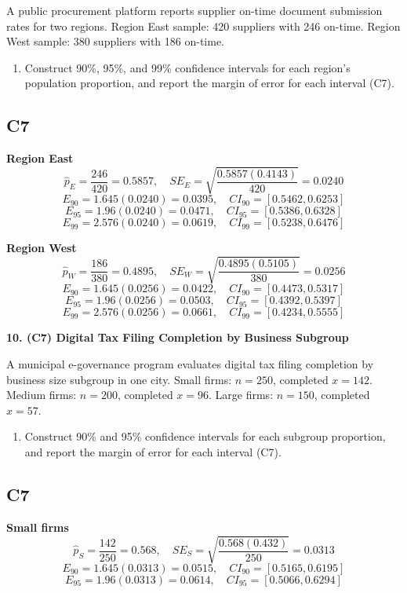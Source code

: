 \begin{ExamProblems}
		A public procurement platform reports supplier on-time document submission rates for two regions.
		Region East sample: 420 suppliers with 246 on-time.
		Region West sample: 380 suppliers with 186 on-time.
		\begin{enumerate}
			\item Construct 90\%, 95\%, and 99\% confidence intervals for each region's population proportion, and report the margin of error for each interval (C7).
		\end{enumerate}
		
		\subsection*{C7}
		\textbf{Region East}
		\[
		\hat{p}_E=\frac{246}{420}=0.5857,
		\quad SE_E=\sqrt{\frac{0.5857(0.4143)}{420}}=0.0240
		\]
		\[
		E_{90}=1.645(0.0240)=0.0395,\quad CI_{90}=[0.5462,0.6253]
		\]
		\[
		E_{95}=1.96(0.0240)=0.0471,\quad CI_{95}=[0.5386,0.6328]
		\]
		\[
		E_{99}=2.576(0.0240)=0.0619,\quad CI_{99}=[0.5238,0.6476]
		\]
		
		\textbf{Region West}
		\[
		\hat{p}_W=\frac{186}{380}=0.4895,
		\quad SE_W=\sqrt{\frac{0.4895(0.5105)}{380}}=0.0256
		\]
		\[
		E_{90}=1.645(0.0256)=0.0422,\quad CI_{90}=[0.4473,0.5317]
		\]
		\[
		E_{95}=1.96(0.0256)=0.0503,\quad CI_{95}=[0.4392,0.5397]
		\]
		\[
		E_{99}=2.576(0.0256)=0.0661,\quad CI_{99}=[0.4234,0.5555]
		\]
		
		\newpage
		\item
		\textbf{10. (C7) Digital Tax Filing Completion by Business Subgroup}
		
		A municipal e-governance program evaluates digital tax filing completion by business size subgroup in one city.
		Small firms: $n=250$, completed $x=142$.
		Medium firms: $n=200$, completed $x=96$.
		Large firms: $n=150$, completed $x=57$.
		\begin{enumerate}
			\item Construct 90\% and 95\% confidence intervals for each subgroup proportion, and report the margin of error for each interval (C7).
		\end{enumerate}
		
		\subsection*{C7}
		\textbf{Small firms}
		\[
		\hat{p}_S=\frac{142}{250}=0.568,
		\quad SE_S=\sqrt{\frac{0.568(0.432)}{250}}=0.0313
		\]
		\[
		E_{90}=1.645(0.0313)=0.0515,\quad CI_{90}=[0.5165,0.6195]
		\]
		\[
		E_{95}=1.96(0.0313)=0.0614,\quad CI_{95}=[0.5066,0.6294]
		\]
		

\end{ExamProblems}
